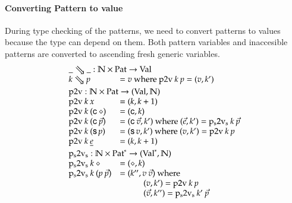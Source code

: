 \paragraph*{Converting Pattern to value}
During type checking of the patterns, we need to convert patterns to values because the type can depend on them.
Both pattern variables and inaccesible patterns are converted to ascending fresh generic variables.
\[
\begin{array}{ll}

\multicolumn{2}{l}{\ptv{\_}{\_}: \cN \times \Pat \ra \Val}\\
\ptv{k}{p} & = v \mbox{ where } \ptvx \: k \: p = (v,k')
\vs\\ 
\multicolumn{2}{l}{\ptvx : \cN \times \Pat \ra (\Val,\cN)}\\
\ptvx \: k \:x & = (k,k+1) \\
\ptvx \: k \: (\cc \: \diamond) & = (\cc,k) \\
\ptvx \: k \: (\cc \: \vec{p}) & = (\cc \: \vec{v},k') \mbox{ where } (\vec{e},k') = \pstvs \: k \: \vec{p}\\
\ptvx \: k \: (\s p) & = (\s v,k') \mbox{ where } (v,k') = \ptvx \: k \: p\\
\ptvx \: k \: \inacc{e} & = (k,k+1) 
\vs\\
\multicolumn{2}{l}{\pstvs : \cN \times \ves{\Pat} \ra (\ves{\Val},\cN)}\\
\pstvs \: k \: \diamond & = (\diamond,k) \\
\pstvs \: k \: (p \: \vec{p}) & = (k'', v \: \vec{v}) \mbox{ where } \\
& \spcx (v,k') = \ptvx \: k \: p \\
& \spcx (\vec{v},k'') = \pstvs \: k' \: \vec{p}  
\end{array}
\]

